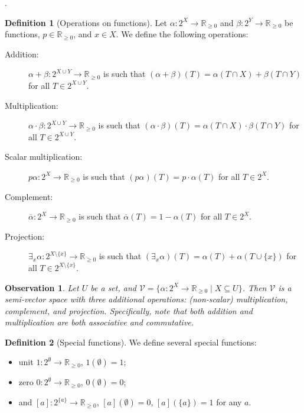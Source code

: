 \documentclass{article}
\newtheorem{observation}{Observation}
\theoremstyle{definition}
\newtheorem{definition}{Definition}
\theoremstyle{remark}
\begin{document}
{\cite{DBLP:conf/aaai/DudekPV20}.

\begin{definition}[Operations on functions]
  Let $\alpha\colon 2^X \to \mathbb{R}_{\ge 0}$ and $\beta\colon 2^Y \to
  \mathbb{R}_{\ge 0}$ be functions, $p \in \mathbb{R}_{\ge 0}$, and $x \in X$.
  We define the following operations:
  \begin{description}
  \item[Addition:] $\alpha + \beta\colon 2^{X \cup Y} \to \mathbb{R}_{\ge 0}$ is
    such that $(\alpha + \beta)(T) = \alpha(T \cap X) + \beta(T \cap Y)$ for all
    $T \in 2^{X \cup Y}$.
  \item[Multiplication:] $\alpha \cdot \beta\colon 2^{X \cup Y} \to
    \mathbb{R}_{\ge 0}$ is such that $(\alpha \cdot \beta)(T) = \alpha(T \cap X)
    \cdot \beta(T \cap Y)$ for all $T \in 2^{X \cup Y}$.
  \item[Scalar multiplication:] $p\alpha\colon 2^X \to \mathbb{R}_{\ge 0}$ is
    such that $(p\alpha)(T) = p \cdot \alpha(T)$ for all $T \in 2^X$.
  \item[Complement:] $\overline{\alpha}\colon 2^X \to \mathbb{R}_{\ge 0}$ is
    such that $\overline{\alpha}(T) = 1 - \alpha(T)$ for all $T \in 2^X$.
  \item[Projection:] $\exists_x\alpha\colon 2^{X \setminus \{ x \}} \to
    \mathbb{R}_{\ge 0}$ is such that $(\exists_x\alpha)(T) = \alpha(T) +
    \alpha(T \cup \{ x \})$ for all $T \in 2^{X \setminus \{x \}}$.
  \end{description}
\end{definition}

\begin{observation}
  Let $U$ be a set, and $\mathcal{V} = \{ \alpha\colon 2^X \to \mathbb{R}_{\ge 0}
  \mid X \subseteq U \}$. Then $\mathcal{V}$ is a semi-vector space with three
  additional operations: (non-scalar) multiplication, complement, and projection.
  Specifically, note that both addition and multiplication are both associative
  and commutative.
\end{observation}

\begin{definition}[Special functions]
  We define several special functions:
  \begin{itemize}
  \item unit $1\colon 2^\emptyset \to \mathbb{R}_{\ge 0}$, $1(\emptyset) = 1$;
  \item zero $0\colon 2^\emptyset \to \mathbb{R}_{\ge 0}$, $0(\emptyset) = 0$;
  \item and $[a]\colon 2^{\{a\}} \to \mathbb{R}_{\ge 0}$, $[a](\emptyset) = 0$,
    $[a](\{a\}) = 1$ for any $a$.
  \end{itemize}
\end{definition}

}
\end{document}
